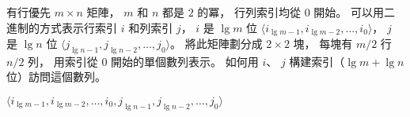 \startEXERCISE
有行優先 $m\times n$ 矩陣，
 $m$ 和 $n$ 都是 $2$ 的冪，
行列索引均從 $0$ 開始。
可以用二進制的方式表示行索引 $i$ 和列索引 $j$，
 $i$ 是 $\lg{m}$ 位 $\langle i_{\lg{m}-1},i_{\lg{m}-2},\ldots,i_0\rangle$，
 $j$ 是 $\lg{n}$ 位 $\langle j_{\lg{n}-1},j_{\lg{n}-2},\ldots,j_0\rangle$。
將此矩陣劃分成 $2\times 2$ 塊，
每塊有 $m/2$ 行 $n/2$ 列，
用索引從 $0$ 開始的單個數列表示。
如何用 $i$、 $j$ 構建索引（$\lg{m}+\lg{n}$ 位）訪問這個數列。
\stopEXERCISE

\startANSWER
$\langle i_{\lg{m}-1},i_{\lg{m}-2},\ldots,i_0, j_{\lg{n}-1},j_{\lg{n}-2},\ldots,j_0\rangle$
\stopANSWER
